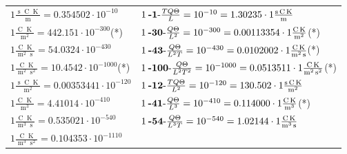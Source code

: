 \begin{center}
\begin{longtable}{l l}
{\color{black}$1 \bm{\mathrm{ }}\frac{\operatorname{s}\operatorname{C}\operatorname{K}}{\operatorname{m}} = 0.354502\cdot10^{-10} $}&
	{\color{black}$1\:\text{\textbf{-1}-} \frac{TQ\Theta}{L}=10^{-10} = 1.30235 \cdot 1 \bm{\mathrm{ }}\frac{\operatorname{s}\operatorname{C}\operatorname{K}}{\operatorname{m}}$}\\
{\color{black}$1 \bm{\mathrm{ }}\frac{\operatorname{C}\operatorname{K}}{\operatorname{m}^2} = 442.151\cdot10^{-300} $}\quad(*)&
	{\color{black}$1\:\text{\textbf{-30}-} \frac{Q\Theta}{L^2}=10^{-300} = 0.00113354 \cdot 1 \bm{\mathrm{ }}\frac{\operatorname{C}\operatorname{K}}{\operatorname{m}^2}$}\quad(*)\\
{\color{black}$1 \bm{\mathrm{ }}\frac{\operatorname{C}\operatorname{K}}{\operatorname{m}^2\operatorname{s}} = 54.0324\cdot10^{-430} $}&
	{\color{black}$1\:\text{\textbf{-43}-} \frac{Q\Theta}{L^2T}=10^{-430} = 0.0102002 \cdot 1 \bm{\mathrm{ }}\frac{\operatorname{C}\operatorname{K}}{\operatorname{m}^2\operatorname{s}}$}\quad(*)\\
{\color{black}$1 \bm{\mathrm{ }}\frac{\operatorname{C}\operatorname{K}}{\operatorname{m}^2\operatorname{s}^2} = 10.4542\cdot10^{-1000} $}\quad(*)&
	{\color{black}$1\:\text{\textbf{-100}-} \frac{Q\Theta}{L^2T^2}=10^{-1000} = 0.0513511 \cdot 1 \bm{\mathrm{ }}\frac{\operatorname{C}\operatorname{K}}{\operatorname{m}^2\operatorname{s}^2}$}\quad(*)\\
{\color{black}$1 \bm{\mathrm{ }}\frac{\operatorname{s}\operatorname{C}\operatorname{K}}{\operatorname{m}^2} = 0.00353441\cdot10^{-120} $}&
	{\color{black}$1\:\text{\textbf{-12}-} \frac{TQ\Theta}{L^2}=10^{-120} = 130.502 \cdot 1 \bm{\mathrm{ }}\frac{\operatorname{s}\operatorname{C}\operatorname{K}}{\operatorname{m}^2}$}\\
{\color{black}$1 \bm{\mathrm{ }}\frac{\operatorname{C}\operatorname{K}}{\operatorname{m}^3} = 4.41014\cdot10^{-410} $}&
	{\color{black}$1\:\text{\textbf{-41}-} \frac{Q\Theta}{L^3}=10^{-410} = 0.114000 \cdot 1 \bm{\mathrm{ }}\frac{\operatorname{C}\operatorname{K}}{\operatorname{m}^3}$}\quad(*)\\
{\color{black}$1 \bm{\mathrm{ }}\frac{\operatorname{C}\operatorname{K}}{\operatorname{m}^3\operatorname{s}} = 0.535021\cdot10^{-540} $}&
	{\color{black}$1\:\text{\textbf{-54}-} \frac{Q\Theta}{L^3T}=10^{-540} = 1.02144 \cdot 1 \bm{\mathrm{ }}\frac{\operatorname{C}\operatorname{K}}{\operatorname{m}^3\operatorname{s}}$}\\
{\color{black}$1 \bm{\mathrm{ }}\frac{\operatorname{C}\operatorname{K}}{\operatorname{m}^3\operatorname{s}^2} = 0.104353\cdot10^{-1110} $}&

\end{longtable}
\end{center}
